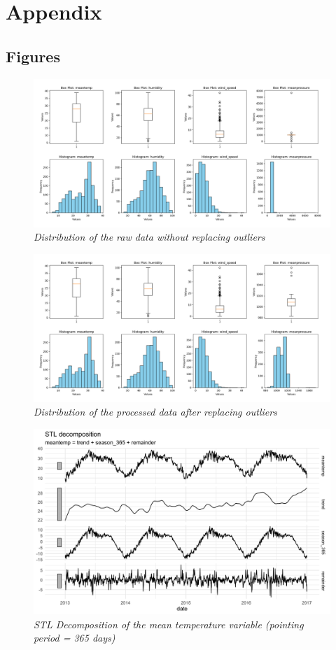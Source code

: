 \clearpage
\section{Appendix}

\subsection{Figures}

\begin{figure}[!h]
    \centering
    \includegraphics[width=.8\textwidth]{images/raw_train_data.png}
    \caption{\small \textit{Distribution of the raw data without replacing outliers}}
    \label{fig:figure1}
\end{figure}

\begin{figure}[!h]
    \centering
    \includegraphics[width=.8\textwidth]{images/processed_train_data_box_and_hist_plots.png}
    \caption{\small \textit{Distribution of the processed data after replacing outliers}}
    \label{fig:figure1}
\end{figure}

\begin{figure}[!h]
    \centering
    \includegraphics[width=.8\textwidth]{images/decomposition_plot.png}
    \caption{\small \textit{STL Decomposition of the mean temperature variable 
    (pointing period = 365 days)}}
    \label{fig:figure1}
\end{figure}

